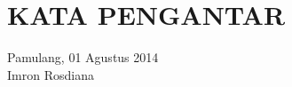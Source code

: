 \chapter*{KATA PENGANTAR}


\lipsum[1-2] %

\hfill
\begin{minipage}[t]{4.9cm}
\centering
	Pamulang, 01 Agustus 2014 \\ [2cm]
	Imron Rosdiana
\end{minipage}

\newpage
